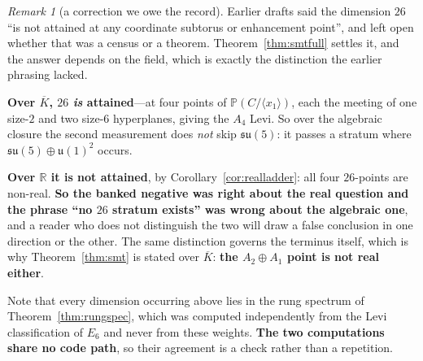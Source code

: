 \documentclass[11pt,reqno]{amsart}
\theoremstyle{plain}
\theoremstyle{definition}
\theoremstyle{remark}
\newtheorem{remark}[theorem]{Remark}
\newcommand{\R}{\mathbb{R}}
\newcommand{\su}{\mathfrak{su}}
\newcommand{\uu}{\mathfrak{u}}
\begin{document}
\begin{remark}[a correction we owe the record]\label{rem:26attained}
Earlier drafts said the dimension $26$ ``is not attained at any coordinate subtorus or
enhancement point'', and left open whether that was a census or a theorem.
Theorem~\ref{thm:smtfull} settles it, and the answer depends on the field, which is
exactly the distinction the earlier phrasing lacked.

\textbf{Over $\overline K$, $26$ \emph{is} attained}---at four points of $\mathbb P(C/\langle
x_1\rangle)$, each the meeting of one size-$2$ and two size-$6$ hyperplanes, giving the
$A_4$ Levi. So over the algebraic closure the second measurement does \emph{not} skip
$\su(5)$: it passes a stratum where $\su(5)\oplus\uu(1)^2$ occurs.

\textbf{Over $\R$ it is not attained}, by Corollary~\ref{cor:realladder}: all four
$26$-points are non-real. \textbf{So the banked negative was right about the real
question and the phrase ``no $26$ stratum exists'' was wrong about the algebraic one},
and a reader who does not distinguish the two will draw a false conclusion in one
direction or the other. The same distinction governs the terminus itself, which is why
Theorem~\ref{thm:smt} is stated over $\overline K$: \textbf{the $A_2\oplus A_1$ point is
not real either}.
\end{remark}

\noindent Note that every dimension occurring above lies in the rung spectrum of
Theorem~\ref{thm:rungspec}, which was computed independently from the Levi
classification of $E_6$ and never from these weights. \textbf{The two computations share
no code path}, so their agreement is a check rather than a repetition.
\end{document}
